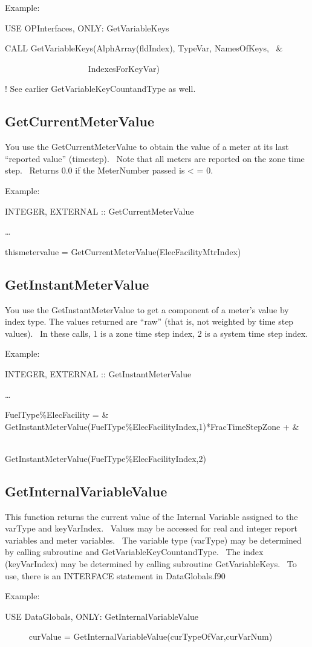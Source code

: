Example:

USE OPInterfaces, ONLY: GetVariableKeys

CALL GetVariableKeys(AlphArray(fldIndex), TypeVar, NamesOfKeys,~ \&

~~~~~~~~~~~~~~~~~~~ IndexesForKeyVar)

! See earlier GetVariableKeyCountandType as well.

\subsection{GetCurrentMeterValue}\label{getcurrentmetervalue}

You use the GetCurrentMeterValue to obtain the value of a meter at its last ``reported value'' (timestep).~ Note that all meters are reported on the zone time step.~ Returns 0.0 if the MeterNumber passed is \textless{} = 0.

Example:

INTEGER, EXTERNAL :: GetCurrentMeterValue

\ldots{}

thismetervalue = GetCurrentMeterValue(ElecFacilityMtrIndex)

\subsection{GetInstantMeterValue}\label{getinstantmetervalue}

You use the GetInstantMeterValue to get a component of a meter's value by index type. The values returned are ``raw'' (that is, not weighted by time step values).~ In these calls, 1 is a zone time step index, 2 is a system time step index.

Example:

INTEGER, EXTERNAL :: GetInstantMeterValue

\ldots{}

FuelType\%ElecFacility = \&~~~ GetInstantMeterValue(FuelType\%ElecFacilityIndex,1)*FracTimeStepZone + \&

~~~~~~~~~~~~~~~~~~~~~~~~~~~~~~~ GetInstantMeterValue(FuelType\%ElecFacilityIndex,2)

\subsection{GetInternalVariableValue}\label{getinternalvariablevalue}

This function returns the current value of the Internal Variable assigned to the varType and keyVarIndex.~ Values may be accessed for real and integer report variables and meter variables.~ The variable type (varType) may be determined by calling subroutine and GetVariableKeyCountandType.~ The index (keyVarIndex) may be determined by calling subroutine GetVariableKeys. ~To use, there is an INTERFACE statement in DataGlobals.f90

Example:

USE DataGlobals, ONLY: GetInternalVariableValue

~~~~~ curValue = GetInternalVariableValue(curTypeOfVar,curVarNum)
